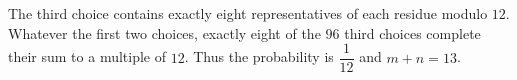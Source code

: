 The third choice contains exactly eight representatives of each residue modulo $12$. Whatever the first two choices, exactly eight of the $96$ third choices complete their sum to a multiple of $12$. Thus the probability is $\dfrac{1}{12}$ and $\boxed{m+n=13}$.
